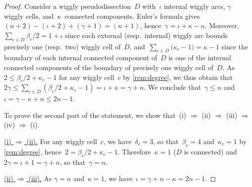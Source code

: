 \documentclass{amsart}
\theoremstyle{definition}
\newcommand{\para}[1]{\smallskip\noindent\uline{#1.}} %
\begin{document}
\begin{proof}
Consider a wiggly pseudodissection~$D$ with~$\iota$ internal wiggly arcs, $\gamma$ wiggly cells, and~$\kappa$~connected components.
Euler's formula gives~$(n+2)-(\iota+2)+(\gamma+1)=(\kappa+1)$, hence~$\gamma=\iota+\kappa-n$.
Moreover, $\sum_{c \in D} \beta_c/2 = 1+\iota$ since each external (resp.~internal) wiggly arc bounds precisely one (resp.~two) wiggly cell of~$D$, and~${\sum_{c \in D} \big( \kappa_c-1 \big) = \kappa-1}$ since the boundary of each internal connected component of~$D$ is one of the internal connected components of the boundary of precisely one wiggly cell of~$D$.
As~$2 \le \beta_c/2+\kappa_c-1$ for any wiggly cell~$c$ by \cref{rem:degree}, we thus obtain that~$2\gamma \le \sum_{c \in D} (\beta_c/2+\kappa_c-1) = \iota+\kappa = \gamma+n$.
We conclude that~$\gamma \le n$ and~$\iota = \gamma-\kappa+n \le 2n-1$.


To prove the second part of the statement, we show that~(i) $\Rightarrow$ (ii) $\Rightarrow$ (iii) $\Rightarrow$ (iv) $\Rightarrow$ (i).

\para{(i) $\Rightarrow$ (ii)}
For any wiggly cell~$c$, we have~$\delta_c = 3$, so that~$\beta_c = 4$ and~$\kappa_c = 1$ by \cref{rem:degree}, hence~$2 = \beta_c/2+\kappa_c-1$.
Therefore~$\kappa = 1$ ($D$ is connected) and~$2\gamma = \iota+1 = \gamma+n$, so that~$\gamma=n$.

\para{(ii) $\Rightarrow$ (iii)}
As $\gamma=n$ and~$\kappa=1$, we have~$\iota = \gamma+n-\kappa = 2n-1$.


\end{proof}
\end{document}
